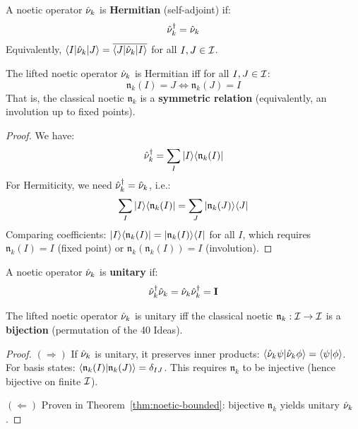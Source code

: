 \begin{definition}
\label{def:hermitian-noetics}
A noetic operator $\hat{\nu}_k$ is \textbf{Hermitian} (self-adjoint) if:
\[
\hat{\nu}_k^\dagger = \hat{\nu}_k
\]
Equivalently, $\langle I|\hat{\nu}_k|J\rangle = \overline{\langle J|\hat{\nu}_k|I\rangle}$ for all $I, J \in \mathcal{I}$.
\end{definition}

\begin{proposition}
\label{prop:hermiticity-cond}
The lifted noetic operator $\hat{\nu}_k$ is Hermitian iff for all $I, J \in \mathcal{I}$:
\[
\mathfrak{n}_k(I) = J \iff \mathfrak{n}_k(J) = I
\]
That is, the classical noetic $\mathfrak{n}_k$ is a \textbf{symmetric relation} (equivalently, an involution up to fixed points).
\end{proposition}

\begin{proof}
We have:
\[
\hat{\nu}_k^\dagger = \sum_I |I\rangle\langle \mathfrak{n}_k(I)|
\]
For Hermiticity, we need $\hat{\nu}_k^\dagger = \hat{\nu}_k$, i.e.:
\[
\sum_I |I\rangle\langle \mathfrak{n}_k(I)| = \sum_J |\mathfrak{n}_k(J)\rangle\langle J|
\]
Comparing coefficients: $|I\rangle\langle \mathfrak{n}_k(I)| = |\mathfrak{n}_k(I)\rangle\langle I|$ for all $I$, which requires $\mathfrak{n}_k(I) = I$ (fixed point) or $\mathfrak{n}_k(\mathfrak{n}_k(I)) = I$ (involution).
\end{proof}

\begin{definition}
\label{def:unitary-noetics}
A noetic operator $\hat{\nu}_k$ is \textbf{unitary} if:
\[
\hat{\nu}_k^\dagger \hat{\nu}_k = \hat{\nu}_k \hat{\nu}_k^\dagger = \mathbf{I}
\]
\end{definition}

\begin{theorem}
\label{thm:unitarity-char}
The lifted noetic operator $\hat{\nu}_k$ is unitary iff the classical noetic $\mathfrak{n}_k : \mathcal{I} \to \mathcal{I}$ is a \textbf{bijection} (permutation of the 40 Ideas).
\end{theorem}

\begin{proof}
$(\Rightarrow)$ If $\hat{\nu}_k$ is unitary, it preserves inner products: $\langle \hat{\nu}_k\psi | \hat{\nu}_k\phi \rangle = \langle \psi | \phi \rangle$. For basis states: $\langle \mathfrak{n}_k(I) | \mathfrak{n}_k(J) \rangle = \delta_{IJ}$. This requires $\mathfrak{n}_k$ to be injective (hence bijective on finite $\mathcal{I}$).

$(\Leftarrow)$ Proven in Theorem~\ref{thm:noetic-bounded}: bijective $\mathfrak{n}_k$ yields unitary $\hat{\nu}_k$.
\end{proof}

